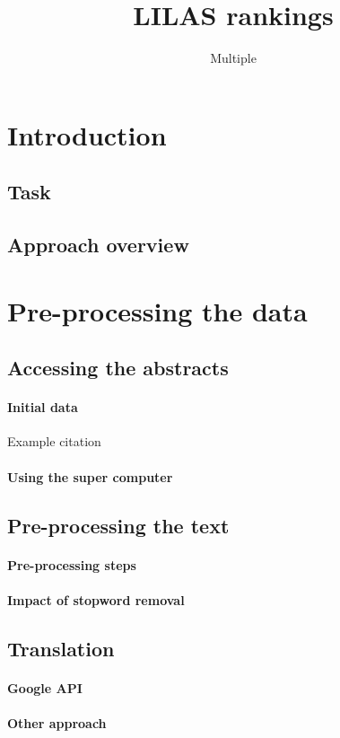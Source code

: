 \documentclass{report}
\author{Multiple}
\title{LILAS rankings}
\begin{document}
\maketitle
\tableofcontents
\chapter{Introduction}
\section{Task}
\section{Approach overview}
\chapter{Pre-processing the data}
\section{Accessing the abstracts}
\subsubsection{Initial data}
Example citation \cite{latex-help}
\subsubsection{Using the super computer}
\section{Pre-processing the text}
\subsubsection{Pre-processing steps}
\subsubsection{Impact of stopword removal}
\section{Translation}
\subsubsection{Google API}
\subsubsection{Other approach}


\end{document}
